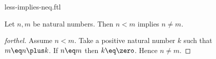 \documentclass{stex}
\begin{document}
\begin{smodule}{less-implies-neq.ftl}


\begin{proposition}[forthel,id=LessImpliesUnequalProp]
  Let $n, m$ be natural numbers.
  Then $n \less m$ implies $n \neq m$.
\end{proposition}
\begin{proof}[forthel]
  Assume $n \less m$.
  Take a positive natural number $k$ such that $m \eq n \plus k$.
  If $n \eq m$ then $k \eq \zero$.
  Hence $n \neq m$.
\end{proof}

\end{smodule}
\end{document}
